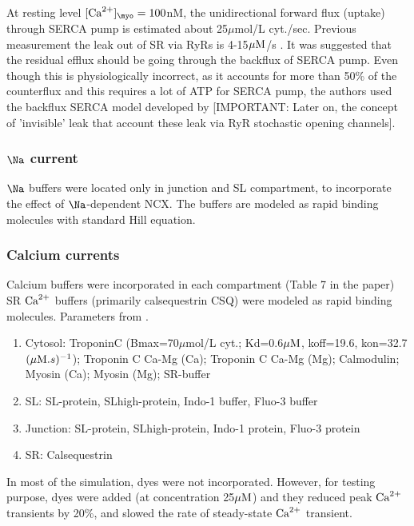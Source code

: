 At resting level $[\Ca]_\myo=100$nM, the unidirectional forward flux (uptake)
through SERCA pump is estimated about 25$\mu$mol/L cyt./sec. Previous
measurement the leak out of SR via RyRs is 4-15${\mu\text{M}}$/s \citep{shannon2002,
lukyanenko2001}. It was suggested that the residual efflux should be going
through the backflux of SERCA pump. Even though this is physiologically
incorrect, as it accounts for more than 50\% of the counterflux and this
requires a lot of ATP for SERCA pump, the authors used the backflux SERCA model
developed by \citep{shannon2000rms} [IMPORTANT: Later on, the concept of
'invisible' leak that account these leak via RyR stochastic opening channels].


\subsubsection{$\Na$ current}

$\Na$ buffers were located only in junction and SL compartment, to incorporate
the effect of $\Na$-dependent NCX. The buffers are modeled as rapid binding
molecules with standard Hill equation.


\subsubsection{Calcium currents}

Calcium buffers were incorporated in each compartment (Table 7 in the paper)
SR ${\text{Ca}^{2+}}$ buffers (primarily calsequestrin CSQ) were modeled as rapid binding
molecules. Parameters from \citep{shannon1997, shannon2000pfs, shannon2000rms}.

\begin{enumerate}
  \item Cytosol: TroponinC (Bmax=70$\mu$mol/L cyt.; Kd=0.6${\mu\text{M}}$, koff=19.6,
  kon=32.7$({\mu\text{M}}.s)^{-1}$); Troponin C Ca-Mg (Ca); Troponin C Ca-Mg (Mg);
  Calmodulin; Myosin (Ca); Myosin (Mg); SR-buffer

  \item SL: SL-protein, SLhigh-protein, Indo-1 buffer, Fluo-3 buffer
  \item Junction: SL-protein, SLhigh-protein, Indo-1 protein, Fluo-3 protein
  \item SR: Calsequestrin
\end{enumerate}
In most of the simulation, dyes were not incorporated. However, for testing
purpose, dyes were added (at concentration 25${\mu\text{M}}$) and they reduced peak ${\text{Ca}^{2+}}$
transients by 20\%, and slowed the rate of steady-state ${\text{Ca}^{2+}}$ transient.


